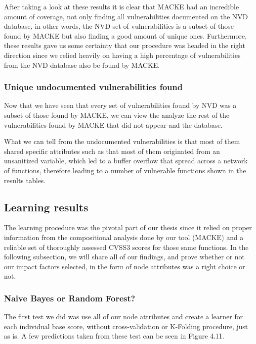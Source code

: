 After taking a look at these results it is clear that MACKE had an incredible amount of coverage, not only finding all vulnerabilities documented on the NVD database, in other words, the NVD set of vulnerabilities is a subset of those found by MACKE but also finding a good amount of unique ones. Furthermore, these results gave us some certainty that our procedure was headed in the right direction since we relied heavily on having a high percentage of vulnerabilities from the NVD database also be found by MACKE.

\subsubsection{Unique undocumented vulnerabilities found}

Now that we have seen that every set of vulnerabilities found by NVD was a subset of those found by MACKE, we can view the analyze the rest of the vulnerabilities found by MACKE that did not appear and the database.

What we can tell from the undocumented vulnerabilities is that most of them shared specific attributes such as that most of them originated from an unsanitized variable, which led to a buffer overflow that spread across a network of functions, therefore leading to a number of vulnerable functions shown in the results tables.

\subsection{Learning results}

The learning procedure was the pivotal part of our thesis since it relied on proper information from the compositional analysis done by our tool (MACKE) and a reliable set of thoroughly assessed CVSS3 scores for those same functions. In the following subsection, we will share all of our findings, and prove whether or not our impact factors selected, in the form of node attributes was a right choice or not.

\subsubsection{Naive Bayes or Random Forest?}

The first test we did was use all of our node attributes and create a learner for each individual base score, without cross-validation or K-Folding procedure, just as is. A few predictions taken from these test can be seen in Figure 4.11.

